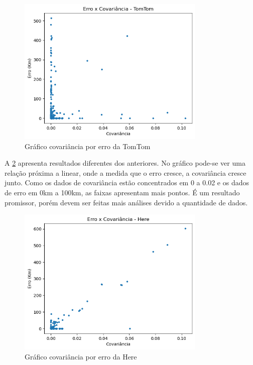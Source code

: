 \begin{figure}[h]
  \centering
  \includegraphics[width=0.8\textwidth]{Figuras/ErroCovT.png}
  \caption{Gráfico covariância por erro da TomTom}
  \label{fig:CovErroT}
\end{figure}

A \ref{fig:CovErroH} apresenta resultados diferentes dos anteriores. No gráfico pode-se ver uma relação próxima a linear, onde a medida que o erro cresce, a covariância cresce junto. Como os dados de covariância estão concentrados em 0 a 0.02 e os dados de erro em 0km a 100km, as faixas apresentam mais pontos. É um resultado promissor, porém devem ser feitas mais análises devido a quantidade de dados. 

\begin{figure}[h]
  \centering
  \includegraphics[width=0.8\textwidth]{Figuras/ErroCovH.png}
  \caption{Gráfico covariância por erro da Here}
  \label{fig:CovErroH}
\end{figure}
